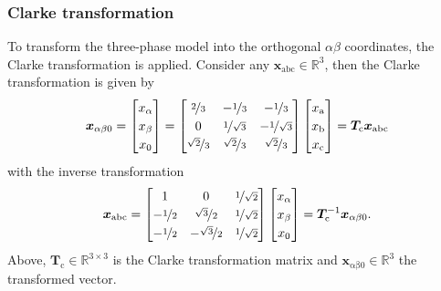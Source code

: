 \begin{frame}
	\frametitle{Clarke transformation}
    To transform the three-phase model into the orthogonal $\alpha\beta$ coordinates, the Clarke transformation is applied. Consider any $\bm{x}_\mathrm{abc}\in\mathbb{R}^3$, then the Clarke transformation is given by
    \begin{equation}
        \renewcommand{\arraystretch}{1.2}
        \bm{x}_{\alpha \beta0} = \begin{bmatrix} x_\alpha \\ x_\beta \\ x_0\end{bmatrix} = \begin{bmatrix}
            \nicefrac{2}{3} & -\nicefrac{1}{3} & -\nicefrac{1}{3}\\
            0 & \nicefrac{1}{\sqrt{3}} & -\nicefrac{1}{\sqrt{3}}\\
            \nicefrac{\sqrt{2}}{3} & \nicefrac{\sqrt{2}}{3} & \nicefrac{\sqrt{2}}{3}
        \end{bmatrix} \begin{bmatrix} x_\mathrm{a} \\ x_\mathrm{b} \\ x_\mathrm{c}\end{bmatrix} = \bm{T}_\mathrm{c} \bm{x}_\mathrm{abc} 
        \label{eq:Clarke_transformation}
    \end{equation}
    \pause
    with the inverse transformation
    \begin{equation}
        \renewcommand{\arraystretch}{1.2}
        \bm{x}_\mathrm{abc}  = \begin{bmatrix}
            1 & 0 & \nicefrac{1}{\sqrt{2}}\\
            -\nicefrac{1}{2} & \nicefrac{\sqrt{3}}{2} & \nicefrac{1}{\sqrt{2}}\\
            -\nicefrac{1}{2} & -\nicefrac{\sqrt{3}}{2} & \nicefrac{1}{\sqrt{2}}
        \end{bmatrix} \begin{bmatrix} x_\alpha \\ x_\beta \\ x_0\end{bmatrix} = \bm{T}_\mathrm{c}^{-1} \bm{x}_{\alpha \beta 0}.
    \end{equation}
    \pause
    Above, $\bm{T}_\mathrm{c}\in\mathbb{R}^{3\times 3}$ is the Clarke transformation matrix and $\bm{x}_\mathrm{\alpha \beta0}\in\mathbb{R}^3$ the transformed vector.
\end{frame}

